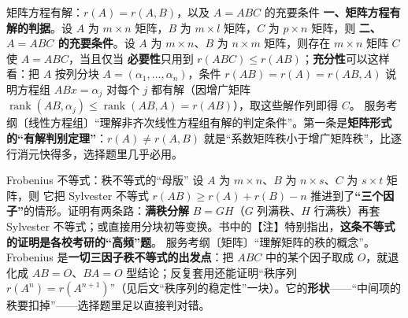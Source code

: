 \begin{fdeep}{矩阵方程有解：$r(A)=r(A,B)$，以及 $A=ABC$ 的充要条件}
\textbf{一、矩阵方程有解的判据}。设 $A$ 为 $m\times n$ 矩阵，$B$ 为 $m\times l$ 矩阵，$C$ 为 $p\times n$ 矩阵，则
\textbf{二、$A=ABC$ 的充要条件}。设 $A$ 为 $m\times n$、$B$ 为 $n\times m$ 矩阵，则存在 $m\times n$ 矩阵 $C$ 使 $A=ABC$，当且仅当
\textbf{必要性}只用到 $r(ABC)\le r(AB)$；\textbf{充分性}可以这样看：把 $A$ 按列分块 $A=(\alpha_1,\dots,\alpha_n)$，条件 $r(AB)=r(A)=r(AB,A)$ 说明方程组 $ABx=\alpha_j$ 对每个 $j$ 都有解（因增广矩阵 $\operatorname{rank}(AB,\alpha_j)\le\operatorname{rank}(AB,A)=r(AB)$），取这些解作列即得 $C$。
\fbref{}服务考纲〔线性方程组〕“理解非齐次线性方程组有解的判定条件”。第一条是\textbf{矩阵形式的“有解判别定理”}：$r(A)\ne r(A,B)$ 就是“系数矩阵秩小于增广矩阵秩”，比逐行消元快得多，选择题里几乎必用。
\end{fdeep}

\begin{fdeep}{Frobenius 不等式：秩不等式的“母版”}
设 $A$ 为 $m\times n$、$B$ 为 $n\times s$、$C$ 为 $s\times t$ 矩阵，则
它把 Sylvester 不等式 $r(AB)\ge r(A)+r(B)-n$ 推进到了\textbf{“三个因子”}的情形。证明有两条路：\textbf{满秩分解} $B=GH$（$G$ 列满秩、$H$ 行满秩）再套 Sylvester 不等式；或直接用分块初等变换。书中的【注】特别指出，\textbf{这条不等式的证明是各校考研的“高频”题}。
\fbref{}服务考纲〔矩阵〕“理解矩阵的秩的概念”。Frobenius 是\textbf{一切三因子秩不等式的出发点}：把 $ABC$ 中的某个因子取成 $O$，就退化成 $AB=O$、$BA=O$ 型结论；反复套用还能证明“秩序列 $r(A^{n})=r(A^{n+1})$”（见后文“秩序列的稳定性”一块）。它的\textbf{形状}——“中间项的秩要扣掉”——选择题里足以直接判对错。
\end{fdeep}

